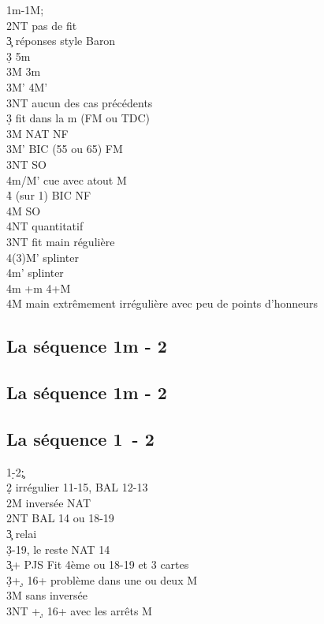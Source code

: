 \documentclass[a4paper]{article}
\begin{document}
\begin{bidtable}
1m-1M;\\
2NT \> pas de fit\+\\
3\c \> réponses style Baron\+\\
3\d \> 5m\\
3M \> 3m\\
3M' \> 4M'\\
3NT \> aucun des cas précédents\-\\
3\d \> fit dans la m (FM ou TDC)\\
3M \> NAT NF\\
3M' \> BIC (55 ou 65) FM\\
3NT \> SO\\
4m/M' \> cue avec atout M\\
4\h \> (sur 1\s ) BIC NF\\
4M \> SO\\
4NT \> quantitatif\-\\
3NT \> fit main régulière\\
4(3)M’ \> splinter\\
4m’ \> splinter\\
4m +m 4+M\\
4M \> main extrêmement irrégulière avec peu de points d’honneurs
\end{bidtable}

\subsection{La séquence 1m - 2\pdfh}

\subsection{La séquence 1m - 2\pdfs}

\subsection{La séquence 1\pdfd\ - 2\pdfc}

\begin{bidtable}
1\d-2\c;\\
2\d \> irrégulier 11-15, BAL 12-13\\
2M \> inversée NAT\\
2NT \> BAL 14 ou 18-19\+\\
3\c \> relai\+\\
3\d {}-19, le reste NAT 14\-\-\\
3\c {}+ PJS Fit 4ème ou 18-19 et 3 cartes\\
3\d {}+\d , 16+ problème dans une ou deux M\\
3M  sans inversée\\
3NT +\d , 16+ avec les arrêts M
\end{bidtable}
\end{document}
